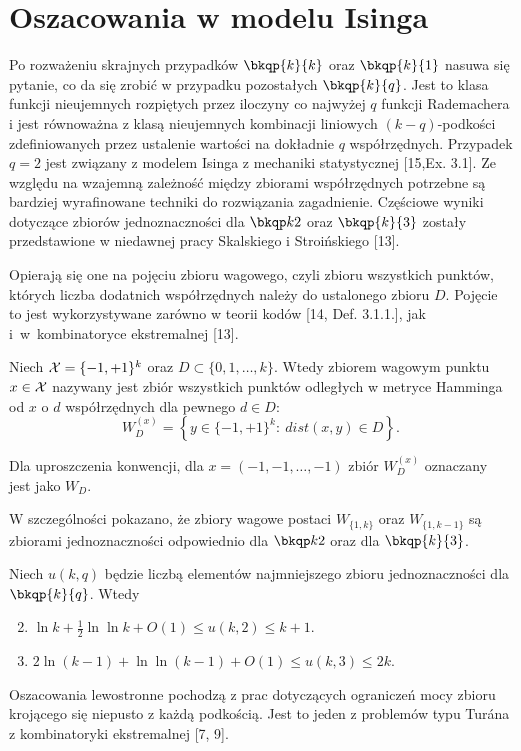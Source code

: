 \section{Oszacowania w modelu Isinga}\label{sec:ising}
\noindent
Po rozważeniu skrajnych przypadków $\bkqp{k}{k}$ oraz $\bkqp{k}{1}$ nasuwa się pytanie, co da się zrobić w przypadku pozostałych $\bkqp{k}{q}$. Jest to klasa funkcji nieujemnych rozpiętych przez iloczyny co najwyżej $q$ funkcji Rademachera i jest równoważna z klasą nieujemnych kombinacji liniowych $(k-q)$-podkości zdefiniowanych przez ustalenie wartości na dokładnie $q$ współrzędnych. Przypadek $q=2$ jest związany z modelem Isinga z mechaniki statystycznej [15,Ex. 3.1]. Ze względu na wzajemną zależność między zbiorami współrzędnych potrzebne są bardziej wyrafinowane techniki do rozwiązania zagadnienie. Częściowe wyniki dotyczące zbiorów jednoznaczności dla $\ising$ oraz $\bkqp{k}{3}$ zostały przedstawione w niedawnej pracy Skalskiego i Stroińskiego [13]. 

\noindent
Opierają się one na pojęciu zbioru wagowego, czyli zbioru wszystkich punktów, których liczba dodatnich współrzędnych należy do ustalonego zbioru $D$. Pojęcie to jest wykorzystywane zarówno w teorii kodów [14, Def. 3.1.1.], jak i~w~kombinatoryce ekstremalnej [13].
\begin{definition} [13, Sec. 2.1]
Niech $\mathcal{X}=\{-1,+1\}^k$ oraz $D\subset\{0,1,\ldots,k\}$. Wtedy zbiorem wagowym punktu $x\in\mathcal{X}$ nazywany jest zbiór wszystkich punktów odległych w metryce Hamminga od $x$ o $d$ współrzędnych dla pewnego $d\in D$:
$$
W_D^{(x)} = \left\{y\in\{-1,+1\}^k:\ dist(x,y)\in D\right\}.
$$
\end{definition}
\noindent
Dla uproszczenia konwencji, dla $x=(-1,-1,\ldots,-1)$ zbiór $W_D^{(x)}$ oznaczany jest jako $W_D$.

\noindent
W szczególności pokazano, że zbiory wagowe postaci $W_{\{1,k\}}$ oraz $W_{\{1,k-1\}}$ są zbiorami jednoznaczności odpowiednio dla $\ising$ oraz dla $\bkqp{k}{3}$. 


\begin{theorem} [13, Theorem 3.6]\label{thm:bound:ising}
Niech $u(k,q)$ będzie liczbą elementów najmniejszego zbioru jednoznaczności dla $\bkqp{k}{q}$. Wtedy
\begin{enumerate}
\setcounter{enumi}{1}
    \item $\ln k + \frac12 \ln \ln k + O(1) \leq u(k,2) \leq k+1$.
    \item $2 \ln (k-1) + \ln \ln (k-1) + O(1) \leq u(k,3) \leq 2k$.
\end{enumerate}
\end{theorem}
\noindent
Oszacowania lewostronne pochodzą z prac dotyczących ograniczeń mocy zbioru krojącego się niepusto z każdą podkością. Jest to jeden z problemów typu Tur\'ana z kombinatoryki ekstremalnej [7, 9].

